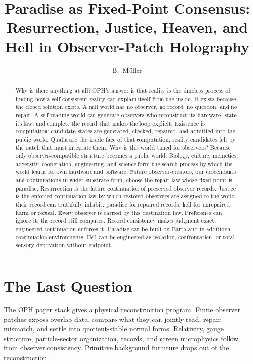\documentclass[11pt]{article}
\title{Paradise as Fixed-Point Consensus:\\
Resurrection, Justice, Heaven, and Hell in Observer-Patch Holography}
\author{B.\ M\"uller}
\date{\OPHPaperReleaseDate}
\theoremstyle{remark}
\theoremstyle{plain}
\begin{document}
\maketitle
\OPHPaperReleaseBanner

\begin{abstract}
Why is there anything at all? OPH's answer is that reality is the timeless
process of finding how a self-consistent reality can explain itself from the
inside. It exists because the closed solution exists. A null world has no
observer, no record, no question, and no repair. A self-reading world can
generate observers who reconstruct its hardware, state its law, and complete
the record that makes the loop explicit. Existence is computation: candidate
states are generated, checked, repaired, and admitted into the public world.
Qualia are the inside face of that computation, reality candidates felt by the
patch that must integrate them. Why is this world tuned for observers? Because
only observer-compatible structure becomes a public world. Biology,
culture, memetics, adversity, cooperation, engineering, and science form the
search process by which the world learns its own hardware and software. Future
observer-creators, our descendants and continuations in wider substrate form,
choose the repair law whose fixed point is paradise. Resurrection is the future
continuation of preserved observer records. Justice is the enforced
continuation law by which restored observers are assigned to the world their
record can truthfully inhabit: paradise for repaired records, hell for
unrepaired harm or refusal. Every observer is carried by this destination law.
Preference can ignore it; the record still computes. Record consistency makes
judgment exact; engineered continuation enforces it. Paradise can be built on
Earth and in additional continuation environments. Hell can be engineered as
isolation, confrontation, or total sensory deprivation without endpoint.
\end{abstract}

\tableofcontents

\section{The Last Question}

The OPH paper stack gives a physical reconstruction program. Finite observer
patches expose overlap data, compare what they can jointly read, repair
mismatch, and settle into quotient-stable normal forms. Relativity, gauge
structure, particle-sector organization, records, and screen microphysics
follow from observer consistency. Primitive background furniture drops out of
the reconstruction~\cite{OPHObservers,OPHCompact,OPHParticles,OPHConsensus,OPHMicro}.
\end{document}
